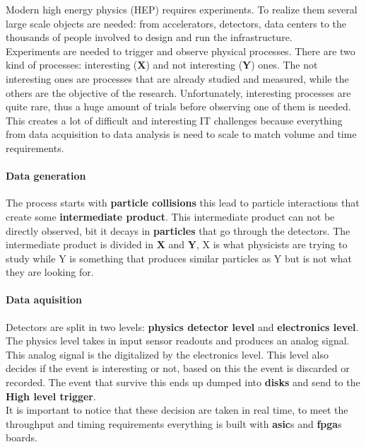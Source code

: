 Modern high energy physics (HEP) requires experiments. To realize them several large scale objects are needed: from accelerators, detectors, data centers to the thousands of people involved to design and run the infrastructure.\\ %
Experiments are needed to trigger and observe physical processes. There are two kind of processes: interesting (\textbf{X}) and not interesting (\textbf{Y}) ones. The not interesting ones are processes that are already studied and measured, while the others are the objective of the research. Unfortunately, interesting processes are quite rare, thus a huge amount of trials before observing one of them is needed. \\
This creates a lot of difficult and interesting IT challenges because everything from data acquisition to data analysis is need to scale to match volume and time requirements. 
\paragraph{Data generation}
The process starts with \textbf{particle collisions} this lead to particle interactions that create some \textbf{intermediate product}. This intermediate product can not be directly observed, bit it decays in \textbf{particles} that go through the detectors. The intermediate product is divided in \textbf{X} and \textbf{Y}, X is what physicists are trying to study while Y is something that produces similar particles as Y but is not what they are looking for.
\paragraph{Data aquisition}
Detectors are split in two levels: \textbf{physics detector level} and \textbf{electronics level}. The physics level takes in input sensor readouts and produces an analog signal. This analog signal is the digitalized by the electronics level. This level also decides if the event is interesting or not, based on this the event is discarded or recorded. 
The event that survive this ends up dumped into \textbf{disks} and send to the \textbf{High level trigger}. \\
It is important to notice that these decision are taken in real time, to meet the throughput and timing requirements everything is built with \textbf{asic}s and \textbf{fpga}s boards. 
